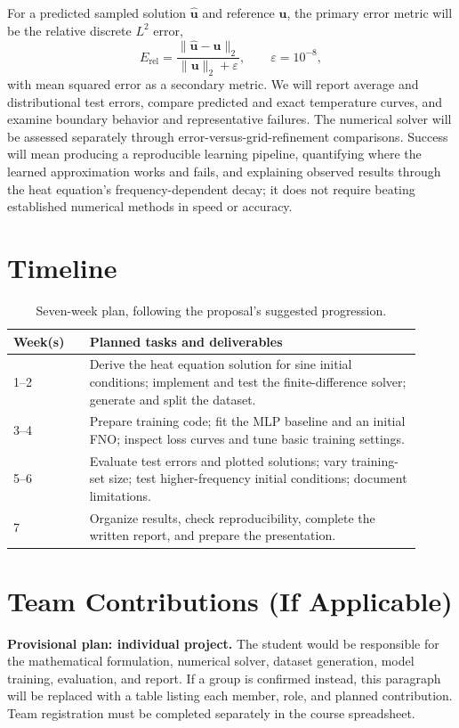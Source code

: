 \documentclass{article}
\begin{document}
For a predicted sampled solution $\widehat{\boldsymbol u}$ and reference $\boldsymbol u$, the primary error metric will be the relative discrete $L^2$ error,
\begin{equation}
E_{\mathrm{rel}}=\frac{\lVert\widehat{\boldsymbol u}-\boldsymbol u\rVert_2}{\lVert\boldsymbol u\rVert_2+\varepsilon},\qquad \varepsilon=10^{-8},
\label{eq:error}
\end{equation}
with mean squared error as a secondary metric. We will report average and distributional test errors, compare predicted and exact temperature curves, and examine boundary behavior and representative failures. The numerical solver will be assessed separately through error-versus-grid-refinement comparisons. Success will mean producing a reproducible learning pipeline, quantifying where the learned approximation works and fails, and explaining observed results through the heat equation's frequency-dependent decay; it does not require beating established numerical methods in speed or accuracy.

\section{Timeline}
\begin{table}[H]
\centering
\caption{Seven-week plan, following the proposal's suggested progression.}
\begin{tabular}{@{}p{0.17\linewidth}p{0.74\linewidth}@{}}
\toprule
\textbf{Week(s)} & \textbf{Planned tasks and deliverables} \\
\midrule
1--2 & Derive the heat equation solution for sine initial conditions; implement and test the finite-difference solver; generate and split the dataset. \\
3--4 & Prepare training code; fit the MLP baseline and an initial FNO; inspect loss curves and tune basic training settings. \\
5--6 & Evaluate test errors and plotted solutions; vary training-set size; test higher-frequency initial conditions; document limitations. \\
7 & Organize results, check reproducibility, complete the written report, and prepare the presentation. \\
\bottomrule
\end{tabular}
\end{table}

\section{Team Contributions (If Applicable)}
\textbf{Provisional plan: individual project.} The student would be responsible for the mathematical formulation, numerical solver, dataset generation, model training, evaluation, and report. If a group is confirmed instead, this paragraph will be replaced with a table listing each member, role, and planned contribution. Team registration must be completed separately in the course spreadsheet.



\end{document}
